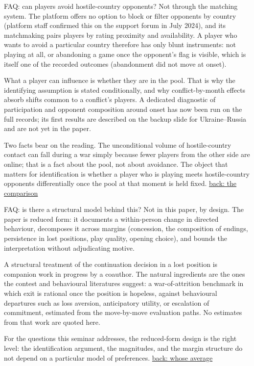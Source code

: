 \documentclass[aspectratio=169,11pt,t]{beamer}
\newcommand{\backto}[2]{\vfill\hfill\hyperlink{#1}{\textcolor{linkblue}{\scriptsize\textsf{back: #2}}}}
\begin{document}
\begin{frame}[label=faq-avoid]{FAQ: can players avoid hostile-country opponents?}
  \footnotesize
  Not through the matching system. The platform offers no option to block or filter opponents by country (platform staff confirmed this on the support forum in July 2024), and its matchmaking pairs players by rating proximity and availability. A player who wants to avoid a particular country therefore has only blunt instruments: not playing at all, or abandoning a game once the opponent's flag is visible, which is itself one of the recorded outcomes (abandonment did not move at onset).

  What a player can influence is whether they are in the pool. That is why the identifying assumption is stated conditionally, and why conflict-by-month effects absorb shifts common to a conflict's players. A dedicated diagnostic of participation and opponent composition around onset has now been run on the full records; its first results are described on the backup slide for Ukraine--Russia and are not yet in the paper.

  Two facts bear on the reading. The unconditional volume of hostile-country contact can fall during a war simply because fewer players from the other side are online; that is a fact about the pool, not about avoidance. The object that matters for identification is whether a player who is playing meets hostile-country opponents differentially once the pool at that moment is held fixed.
  \backto{comparison}{the comparison}
\end{frame}

\begin{frame}[label=faq-structural]{FAQ: is there a structural model behind this?}
  \footnotesize
  Not in this paper, by design. The paper is reduced form: it documents a within-person change in directed behaviour, decomposes it across margins (concession, the composition of endings, persistence in lost positions, play quality, opening choice), and bounds the interpretation without adjudicating motive.

  A structural treatment of the continuation decision in a lost position is companion work in progress by a coauthor. The natural ingredients are the ones the contest and behavioural literatures suggest: a war-of-attrition benchmark in which exit is rational once the position is hopeless, against behavioural departures such as loss aversion, anticipatory utility, or escalation of commitment, estimated from the move-by-move evaluation paths. No estimates from that work are quoted here.

  For the questions this seminar addresses, the reduced-form design is the right level: the identification argument, the magnitudes, and the margin structure do not depend on a particular model of preferences.
  \backto{whoseaverage}{whose average}
\end{frame}
\end{document}
